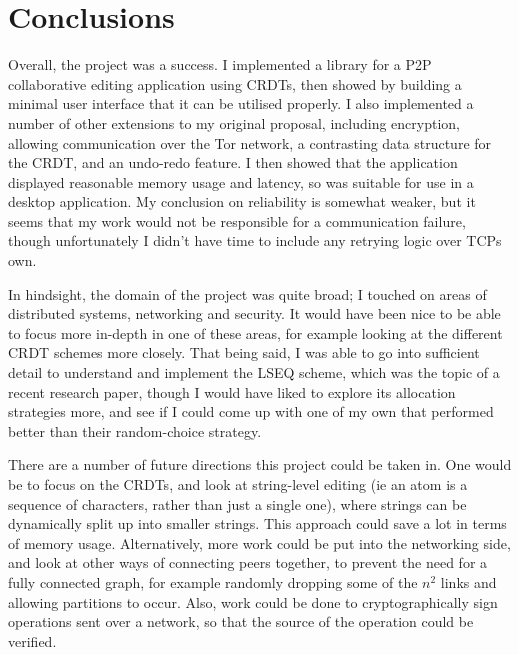 \documentclass[diss.tex]{subfiles}
\begin{document}
\chapter{Conclusions}
\label{chap:conclusions}
Overall, the project was a success. I implemented a library for a P2P collaborative editing application using CRDTs, then showed by building a minimal user interface that it can be utilised properly. I also implemented a number of other extensions to my original proposal, including encryption, allowing communication over the Tor network, a contrasting data structure for the CRDT, and an undo-redo feature. I then showed that the application displayed reasonable memory usage and latency, so was suitable for use in a desktop application. My conclusion on reliability is somewhat weaker, but it seems that my work would not be responsible for a communication failure, though unfortunately I didn't have time to include any retrying logic over TCPs own.

In hindsight, the domain of the project was quite broad; I touched on areas of distributed systems, networking and security. It would have been nice to be able to focus more in-depth in one of these areas, for example looking at the different CRDT schemes more closely. That being said, I was able to go into sufficient detail to understand and implement the LSEQ scheme, which was the topic of a recent research paper, though I would have liked to explore its allocation strategies more, and see if I could come up with one of my own that performed better than their random-choice strategy.

There are a number of future directions this project could be taken in. One would be to focus on the CRDTs, and look at string-level editing (ie an atom is a sequence of characters, rather than just a single one), where strings can be dynamically split up into smaller strings. This approach could save a lot in terms of memory usage. Alternatively, more work could be put into the networking side, and look at other ways of connecting peers together, to prevent the need for a fully connected graph, for example randomly dropping some of the $n^2$ links and allowing partitions to occur. Also, work could be done to cryptographically sign operations sent over a network, so that the source of the operation could be verified.
\end{document}
